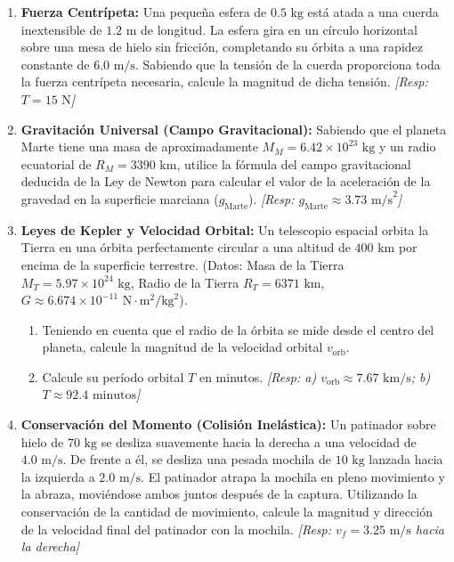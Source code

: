 \documentclass[11pt,a4paper]{book}
\begin{document}
\begin{enumerate}
    \item \textbf{Fuerza Centrípeta:} Una pequeña esfera de $0.5 \text{ kg}$ está atada a una cuerda inextensible de $1.2 \text{ m}$ de longitud. La esfera gira en un círculo horizontal sobre una mesa de hielo sin fricción, completando su órbita a una rapidez constante de $6.0 \text{ m/s}$. Sabiendo que la tensión de la cuerda proporciona toda la fuerza centrípeta necesaria, calcule la magnitud de dicha tensión. \textit{[Resp: $T = 15 \text{ N}$]}

    \item \textbf{Gravitación Universal (Campo Gravitacional):} Sabiendo que el planeta Marte tiene una masa de aproximadamente $M_M = 6.42 \times 10^{23} \text{ kg}$ y un radio ecuatorial de $R_M = 3390 \text{ km}$, utilice la fórmula del campo gravitacional deducida de la Ley de Newton para calcular el valor de la aceleración de la gravedad en la superficie marciana ($g_{\text{Marte}}$). \textit{[Resp: $g_{\text{Marte}} \approx 3.73 \text{ m/s}^2$]}

    \item \textbf{Leyes de Kepler y Velocidad Orbital:} Un telescopio espacial orbita la Tierra en una órbita perfectamente circular a una altitud de $400 \text{ km}$ por encima de la superficie terrestre. (Datos: Masa de la Tierra $M_T = 5.97 \times 10^{24} \text{ kg}$, Radio de la Tierra $R_T = 6371 \text{ km}$, $G \approx 6.674 \times 10^{-11} \text{ N}\cdot\text{m}^2/\text{kg}^2$).
    \begin{enumerate}
        \item Teniendo en cuenta que el radio de la órbita se mide desde el centro del planeta, calcule la magnitud de la velocidad orbital $v_{\text{orb}}$.
        \item Calcule su período orbital $T$ en minutos. \textit{[Resp: a) $v_{\text{orb}} \approx 7.67 \text{ km/s}$; b) $T \approx 92.4 \text{ minutos}$]}
    \end{enumerate}

    \item \textbf{Conservación del Momento (Colisión Inelástica):} Un patinador sobre hielo de $70 \text{ kg}$ se desliza suavemente hacia la derecha a una velocidad de $4.0 \text{ m/s}$. De frente a él, se desliza una pesada mochila de $10 \text{ kg}$ lanzada hacia la izquierda a $2.0 \text{ m/s}$. El patinador atrapa la mochila en pleno movimiento y la abraza, moviéndose ambos juntos después de la captura. Utilizando la conservación de la cantidad de movimiento, calcule la magnitud y dirección de la velocidad final del patinador con la mochila. \textit{[Resp: $v_f = 3.25 \text{ m/s}$ hacia la derecha]}


\end{enumerate}
\end{document}
